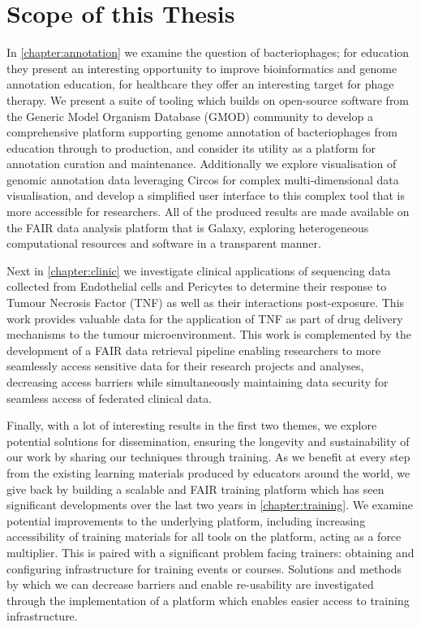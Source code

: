 \section{Scope of this Thesis} %
In \cref{chapter:annotation} we examine the question of bacteriophages; for education they present an interesting opportunity to improve bioinformatics and genome annotation education, for healthcare they offer an interesting target for phage therapy.
We present a suite of tooling which builds on open-source software from the Generic Model Organism Database (GMOD)\cite{Stein_2002} community to develop a comprehensive platform supporting genome annotation of bacteriophages from education through to production, and consider its utility as a platform for annotation curation and maintenance.
Additionally we explore visualisation of genomic annotation data leveraging Circos\cite{Circos} for complex multi-dimensional data visualisation, and develop a simplified user interface to this complex tool that is more accessible for researchers.
All of the produced results are made available on the FAIR data analysis platform that is Galaxy\cite{Afgan2018,Jalili2020}, exploring heterogeneous computational resources and software in a transparent manner. %

Next in \cref{chapter:clinic} we investigate clinical applications of sequencing data collected from Endothelial cells and Pericytes to determine their response to Tumour Necrosis Factor (TNF) as well as their interactions post-exposure. This work provides valuable data for the application of TNF as part of drug delivery mechanisms to the tumour microenvironment.
This work is complemented by the development of a FAIR data retrieval pipeline enabling researchers to more seamlessly access sensitive data for their research projects and analyses, decreasing access barriers while simultaneously maintaining data security for seamless access of federated clinical data.

Finally, with a lot of interesting results in the first two themes, we explore potential solutions for dissemination, ensuring the longevity and sustainability of our work by sharing our techniques through training.
As we benefit at every step from the existing learning materials produced by educators around the world, we give back by building a scalable and FAIR training platform which has seen significant developments over the last two years in \cref{chapter:training}.
We examine potential improvements to the underlying platform, including increasing accessibility of training materials for all tools on the platform, acting as a force multiplier.
This is paired with a significant problem facing trainers: obtaining and configuring infrastructure for training events or courses.
Solutions and methods by which we can decrease barriers and enable re-usability are investigated through the implementation of a platform which enables easier access to training infrastructure. %


\footnotesize


\normalsize
